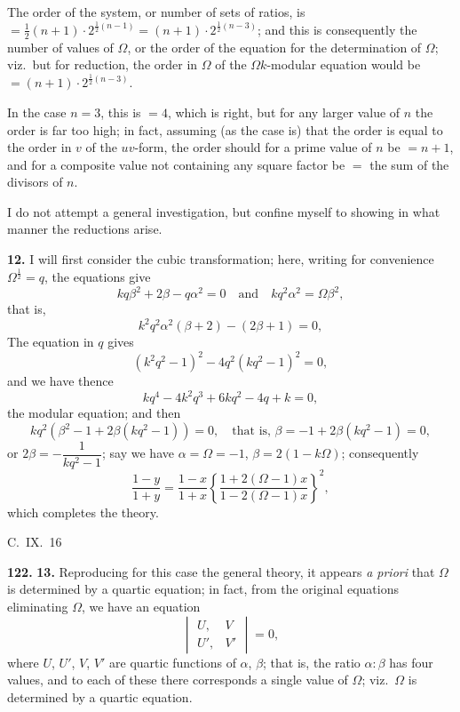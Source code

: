 \documentclass[11pt,a4paper]{book}
\begin{document}
The order of the system, or number of sets of ratios, is $= \frac{1}{2}(n + 1) \cdot 2^{\frac{1}{2}(n-1)} = (n + 1) \cdot 2^{\frac{1}{2}(n-3)}$; and this is consequently the number of values of $\Omega$, or the order of the equation for the determination of $\Omega$; viz.\ but for reduction, the order in $\Omega$ of the $\Omega k$-modular equation would be $= (n + 1) \cdot 2^{\frac{1}{2}(n-3)}$.

In the case $n = 3$, this is $= 4$, which is right, but for any larger value of $n$ the order is far too high; in fact, assuming (as the case is) that the order is equal to the order in $v$ of the $uv$-form, the order should for a prime value of $n$ be $= n + 1$, and for a composite value not containing any square factor be $=$ the sum of the divisors of $n$.

I do not attempt a general investigation, but confine myself to showing in what manner the reductions arise.

\medskip
\noindent\textbf{12.} I will first consider the cubic transformation; here, writing for convenience $\Omega^{\frac{1}{2}} = q$, the equations give
\[
kq\beta^2 + 2\beta - q\alpha^2 = 0 \quad \text{and} \quad kq^2\alpha^2 = \Omega\beta^2,
\]
that is,
\[
k^2q^2\alpha^2(\beta + 2) - (2\beta + 1) = 0,
\]
The equation in $q$ gives
\[
(k^2q^2 - 1)^2 - 4q^2(kq^2 - 1)^2 = 0,
\]
and we have thence
\[
kq^4 - 4k^2q^3 + 6kq^2 - 4q + k = 0,
\]
the modular equation; and then
\[
kq^2(\beta^2 - 1 + 2\beta(kq^2 - 1)) = 0, \quad \text{that is, } \beta = -1 + 2\beta(kq^2 - 1) = 0,
\]
or $2\beta = -\dfrac{1}{kq^2 - 1}$; say we have $\alpha = \Omega = -1$, $\beta = 2(1 - k\Omega)$; consequently
\[
\frac{1 - y}{1 + y} = \frac{1 - x}{1 + x}\left\{\frac{1 + 2(\Omega - 1)x}{1 - 2(\Omega - 1)x}\right\}^2,
\]
which completes the theory.

\begin{flushright}
C.~IX.~16
\end{flushright}

\medskip
\noindent\textbf{122.} \textbf{13.} Reproducing for this case the general theory, it appears \textit{a priori} that $\Omega$ is determined by a quartic equation; in fact, from the original equations eliminating $\Omega$, we have an equation
\[
\begin{vmatrix} U, & V \\ U', & V' \end{vmatrix} = 0,
\]
where $U$, $U'$, $V$, $V'$ are quartic functions of $\alpha$, $\beta$; that is, the ratio $\alpha : \beta$ has four values, and to each of these there corresponds a single value of $\Omega$; viz.\ $\Omega$ is determined by a quartic equation.
\end{document}
